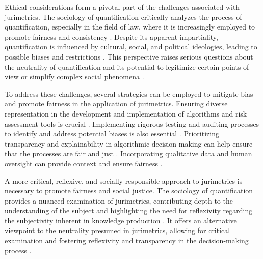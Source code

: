 Ethical considerations form a pivotal part of the challenges associated with jurimetrics. The sociology of quantification critically analyzes the process of quantification, especially in the field of law, where it is increasingly employed to promote fairness and consistency \cite{10.1057/s41599-020-00557-0, de2010jurimetrics}. Despite its apparent impartiality, quantification is influenced by cultural, social, and political ideologies, leading to possible biases and restrictions \cite{10.1177/09596801221075807, de2010jurimetrics}. This perspective raises serious questions about the neutrality of quantification and its potential to legitimize certain points of view or simplify complex social phenomena \cite{10.1111/ilr.12067, de2010jurimetrics}.

To address these challenges, several strategies can be employed to mitigate bias and promote fairness in the application of jurimetrics. Ensuring diverse representation in the development and implementation of algorithms and risk assessment tools is crucial \cite{10.1590/dados.2022.65.3.267,10.32586/rcda.v18i1.585}. Implementing rigorous testing and auditing processes to identify and address potential biases is also essential \cite{10.1590/dados.2022.65.3.267,10.32586/rcda.v18i1.585}. Prioritizing transparency and explainability in algorithmic decision-making can help ensure that the processes are fair and just \cite{10.1590/dados.2022.65.3.267,10.32586/rcda.v18i1.585}. Incorporating qualitative data and human oversight can provide context and ensure fairness \cite{10.1590/dados.2022.65.3.267,10.32586/rcda.v18i1.585}.

A more critical, reflexive, and socially responsible approach to jurimetrics is necessary to promote fairness and social justice. The sociology of quantification provides a nuanced examination of jurimetrics, contributing depth to the understanding of the subject and highlighting the need for reflexivity regarding the subjectivity inherent in knowledge production \cite{10.1590/dados.2022.65.3.267,10.32586/rcda.v18i1.585}. It offers an alternative viewpoint to the neutrality presumed in jurimetrics, allowing for critical examination and fostering reflexivity and transparency in the decision-making process \cite{10.1590/dados.2022.65.3.267,10.32586/rcda.v18i1.585}.

